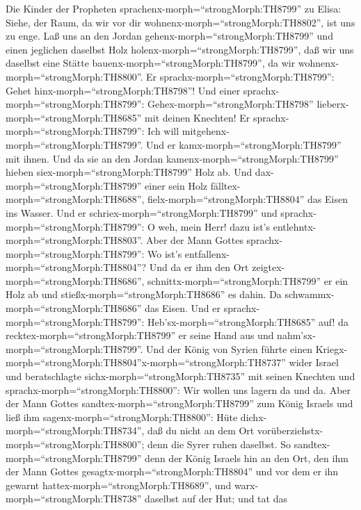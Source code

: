  Die Kinder der Propheten
sprachenx-morph=``strongMorph:TH8799'' zu Elisa: Siehe, der Raum, da wir
vor dir wohnenx-morph=``strongMorph:TH8802'', ist uns zu enge.
 Laß uns an den Jordan gehenx-morph=``strongMorph:TH8799''
und einen jeglichen daselbst Holz holenx-morph=``strongMorph:TH8799'',
daß wir uns daselbst eine Stätte bauenx-morph=``strongMorph:TH8799'', da
wir wohnenx-morph=``strongMorph:TH8800''. Er
sprachx-morph=``strongMorph:TH8799'': Gehet
hinx-morph=``strongMorph:TH8798''!  Und einer
sprachx-morph=``strongMorph:TH8799'': Gehex-morph=``strongMorph:TH8798''
lieberx-morph=``strongMorph:TH8685'' mit deinen Knechten! Er
sprachx-morph=``strongMorph:TH8799'': Ich will
mitgehenx-morph=``strongMorph:TH8799''.  Und er
kamx-morph=``strongMorph:TH8799'' mit ihnen. Und da sie an den Jordan
kamenx-morph=``strongMorph:TH8799'' hieben
siex-morph=``strongMorph:TH8799'' Holz ab.  Und
dax-morph=``strongMorph:TH8799'' einer sein Holz
fälltex-morph=``strongMorph:TH8688'', fielx-morph=``strongMorph:TH8804''
das Eisen ins Wasser. Und er schriex-morph=``strongMorph:TH8799'' und
sprachx-morph=``strongMorph:TH8799'': O weh, mein Herr! dazu ist's
entlehntx-morph=``strongMorph:TH8803''.  Aber der Mann
Gottes sprachx-morph=``strongMorph:TH8799'': Wo ist's
entfallenx-morph=``strongMorph:TH8804''? Und da er ihm den Ort
zeigtex-morph=``strongMorph:TH8686'',
schnittx-morph=``strongMorph:TH8799'' er ein Holz ab und
stießx-morph=``strongMorph:TH8686'' es dahin. Da
schwammx-morph=``strongMorph:TH8686'' das Eisen.  Und er
sprachx-morph=``strongMorph:TH8799'':
Heb'sx-morph=``strongMorph:TH8685'' auf! da
recktex-morph=``strongMorph:TH8799'' er seine Hand aus und
nahm'sx-morph=``strongMorph:TH8799''.  Und der König von
Syrien führte einen
Kriegx-morph=``strongMorph:TH8804''x-morph=``strongMorph:TH8737'' wider
Israel und beratschlagte sichx-morph=``strongMorph:TH8735'' mit seinen
Knechten und sprachx-morph=``strongMorph:TH8800'': Wir wollen uns lagern
da und da.  Aber der Mann Gottes
sandtex-morph=``strongMorph:TH8799'' zum König Israels und ließ ihm
sagenx-morph=``strongMorph:TH8800'': Hüte
dichx-morph=``strongMorph:TH8734'', daß du nicht an dem Ort
vorüberziehstx-morph=``strongMorph:TH8800''; denn die Syrer ruhen
daselbst.  So sandtex-morph=``strongMorph:TH8799'' denn der
König Israels hin an den Ort, den ihm der Mann Gottes
gesagtx-morph=``strongMorph:TH8804'' und vor dem er ihn gewarnt
hattex-morph=``strongMorph:TH8689'', und
warx-morph=``strongMorph:TH8738'' daselbst auf der Hut; und tat das
